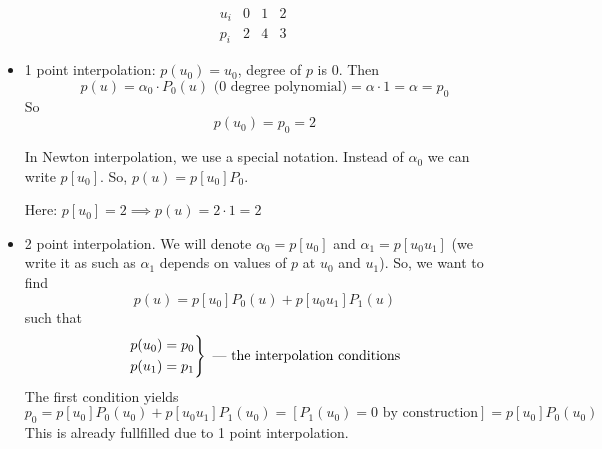 \begin{example}
    \[ \begin{array}{c|c|c|c}
        u_i & 0 & 1 & 2\\
        \hline
        p_i & 2 & 4 & 3
    \end{array} \]

    \begin{center}   
    \end{center}

    \begin{itemize}
        \item {
            1 point interpolation:
            $p(u_0) = u_0$, degree of $p$ is 0.
            Then
            \[ p(u) = \alpha_0 \cdot P_0(u) \text{ (0 degree polynomial)} = \alpha \cdot 1 = \alpha = p_0 \]
            So
            \[ p(u_0) = p_0 = 2 \]

            In Newton interpolation, we use a special notation.
            Instead of $\alpha_0$ we can write $p[u_0]$. So, $p(u) = p[u_0] P_0$.

            Here: $p[u_0] = 2 \implies p(u) = 2 \cdot 1 = 2$
        }
        \item {
            2 point interpolation. We will denote 
            $\alpha_0 = p[u_0]$ and $\alpha_1 = p[u_0 u_1]$
            (we write it as such as $\alpha_1$ depends on values of $p$ at $u_0$ and $u_1$).
            So, we want to find
            \[ p(u) = p[u_0] P_0(u) + p[u_0 u_1] P_{1}(u) \]
            such that
            \[
                \begin{drcases}
                    p(u_0) = p_0\\
                    p(u_1) = p_1
                \end{drcases} \text{ --- the interpolation conditions}
            \]
            The first condition yields
            \[
                p_0 = p[u_0] P_0(u_0) + p[u_0 u_1] P_1(u_0) =
                \left[P_1(u_0) = 0 \text{ by construction}\right] =
                p[u_0] P_0(u_0)
            \]
            This is already fullfilled due to 1 point interpolation.

}
\end{itemize}
\end{example}
